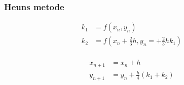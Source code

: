 %
%
%
\begin{frame}
\frametitle{Heuns metode }
\begin{minipage}[t]{0.31\textwidth}
\begin{align*}
k_1 & = f(x_n , y_n) \\
k_2 & = f \left( x_n + \frac{2}{3} h , y_n = + \frac{2}{3} h k_1 \right) \\
\end{align*}
%
\end{minipage} 
\phantom{Hej}
\begin{minipage}[t]{0.31\textwidth}
\begin{align*}
x_{n+1} & = x_n+h \\
y_{n+1} & = y_n + \frac{h}{4} (k_1 + k_2 )  \\
\end{align*}
%
\end{minipage} 
\\

\\
\phantom{H}
\\
\end{frame}
